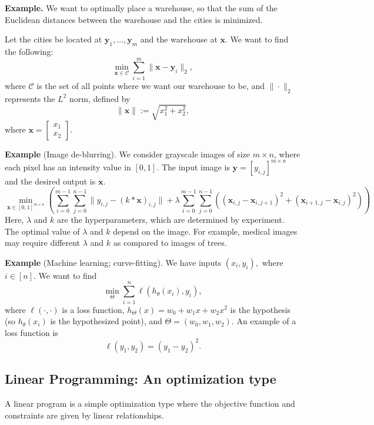 \documentclass[twoside]{article}
\begin{document}
\textbf{Example.} We want to optimally place a warehouse, so that the sum of the
Euclidean distances between the warehouse and the cities is minimized.

Let the cities be located at $\mathbf{y}_1, \ldots, \mathbf{y}_m$ and the
warehouse at $\mathbf{x}$. We want to find the following: \[
    \min_{\mathbf{x} \in \mathscr{C}}
    \sum_{i = 1}^{m} \|\mathbf{x} - \mathbf{y}_i\|_2,
\] where $\mathscr{C}$ is the set of all points where we want our warehouse to
be, and $\| \cdot \|_2$ represents the $L^2$ norm, defined by \[
   \|\mathbf{x}\| := \sqrt{x_1^2 + x_2^2},
\] where $\mathbf{x} = \begin{bmatrix} x_1 \\ x_2 \end{bmatrix}$.


\textbf{Example} (Image de-blurring). We consider grayscale images of size $m
\times n$, where each pixel has an intensity value in $[0, 1].$ The input image
is $\mathbf{y} = [y_{i, j}]^{m \times n}$ and the desired output is
$\mathbf{x}.$
\[
    \min_{\mathbf{x} \in [0, 1]^{m \times n}}
    \left(
        \sum_{i = 0}^{m - 1} \sum_{j = 0}^{n - 1}
            \|y_{i, j} - (k * \mathbf{x})_{i, j}\|
        + \lambda \sum_{i = 0}^{m - 1} \sum_{j = 0}^{n - 1}
            ((\mathbf{x}_{i, j} - \mathbf{x}_{i, j + 1})^2
             + (\mathbf{x}_{i + 1, j} - \mathbf{x}_{i, j})^2)
    \right)
\] Here, $\lambda$ and $k$ are the hyperparameters, which are determined by
experiment. The optimal value of $\lambda$ and $k$ depend on the image. For
example, medical images may require different $\lambda$ and $k$ as compared to
images of trees.


\textbf{Example} (Machine learning; curve-fitting). We have inputs $(x_i, y_i),$
where $i \in [n].$ We want to find \[
    \min_\Theta \sum_{i = 1}^{n} \ell(h_\theta(x_i), y_i),
\] where $\ell(\cdot, \cdot)$ is a loss function, $h_\Theta(x) = w_0 + w_1 x +
w_2 x^2$ is the hypothesis (so $h_\theta(x_i)$ is the hypothesized point), and
$\Theta = (w_0, w_1, w_2)$. An example of a loss function is \[
    \ell(y_1, y_2) = (y_1 - y_2)^2.
\] 

\subsection{Linear Programming: An optimization type}
A linear program is a simple optimization type where the objective function and
constraints are given by linear relationships.
\end{document}
